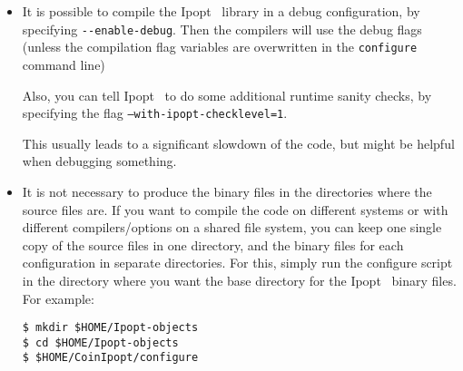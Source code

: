 \documentclass[10pt]{article}
\newcommand{\Ipopt}{{\sc Ipopt }}
\begin{document}
\begin{itemize}
\item It is possible to compile the \Ipopt\ library in a debug
  configuration, by specifying \verb|--enable-debug|.  Then the
  compilers will use the debug flags (unless the compilation flag
  variables are overwritten in the {\tt configure} command line)

  Also, you can tell \Ipopt\ to do some additional runtime sanity
  checks, by specifying the flag {\tt --with-ipopt-checklevel=1}.

  This usually leads to a significant slowdown of the code, but might
  be helpful when debugging something.

\item It is not necessary to produce the binary files in the
  directories where the source files are.  If you want to compile the
  code on different systems or with different compilers/options on a
  shared file system, you can keep one single copy of the source files
  in one directory, and the binary files for each configuration in
  separate directories.  For this, simply run the configure script in
  the directory where you want the base directory for the \Ipopt\
  binary files.  For example:

  {\tt \$ mkdir \$HOME/Ipopt-objects}\\
  {\tt \$ cd \$HOME/Ipopt-objects}\\
  {\tt \$ \$HOME/CoinIpopt/configure}

\end{itemize}

%
%

\end{document}
